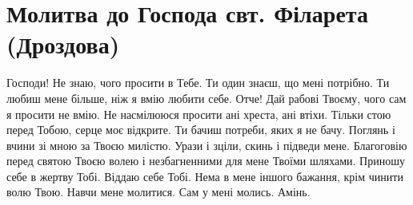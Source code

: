 \documentclass[chapters.tex]{subfiles}
\begin{document}
\section{Молитва до Господа свт. Філарета (Дроздова)}
Господи! Не знаю, чого просити в Тебе. Ти один знаєш, що мені потрібно. Ти любиш мене більше, ніж я вмію любити себе. Отче! Дай рабові Твоєму, чого сам я просити не вмію. Не насмілююся просити ані хреста, ані втіхи. Тільки стою перед Тобою, серце моє відкрите. Ти бачиш потреби, яких я не бачу. Поглянь і вчини зі мною за Твоєю милістю. Урази і зціли, скинь і підведи мене. Благоговію перед святою Твоєю волею і незбагненними для мене Твоїми шляхами. Приношу себе в жертву Тобі. Віддаю себе Тобі. Нема в мене іншого бажання, крім чинити волю Твою. Навчи мене молитися. Сам у мені молись. Амінь.
\end{document}
